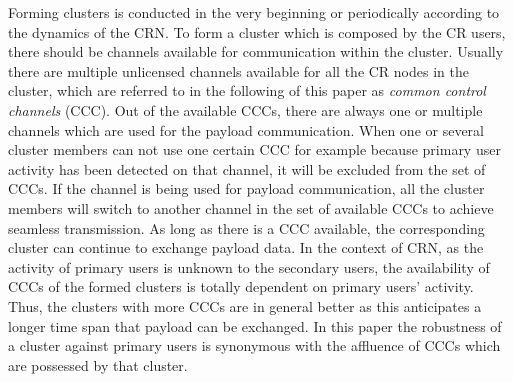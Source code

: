 \documentclass[10pt,journal,compsoc]{IEEEtran}
\theoremstyle{mytheoremstyle}
\theoremstyle{mytheoremstyle}
\theoremstyle{mytheoremstyle}
\newcommand{\ie}{i.e., }
\begin{document}

Forming clusters is conducted in the very beginning or periodically according to the dynamics of the CRN.
To form a cluster which is composed by the CR users, there should be channels available for communication within the cluster.
Usually there are multiple unlicensed channels available for all the CR nodes in the cluster, which are referred to in the following of this paper as \textit{common control channels} (CCC).
Out of the available CCCs, there are always one or multiple channels which are used for the payload communication.
When one or several cluster members can not use one certain CCC for example because primary user activity has been detected on that channel, it will be excluded from the set of CCCs.
If the channel is being used for payload communication, all the cluster members will switch to another channel in the set of available CCCs to achieve seamless transmission.
As long as there is a CCC available, the corresponding cluster can continue to exchange payload data.
In the context of CRN, as the activity of primary users is unknown to the secondary users, the availability of CCCs of the formed clusters is totally dependent on primary users' activity.
Thus, the clusters with more CCCs are in general better as this anticipates a longer time span that payload can be exchanged.
In this paper the robustness of a cluster against primary users is synonymous with the affluence of CCCs which are possessed by that cluster. 
\end{document}
